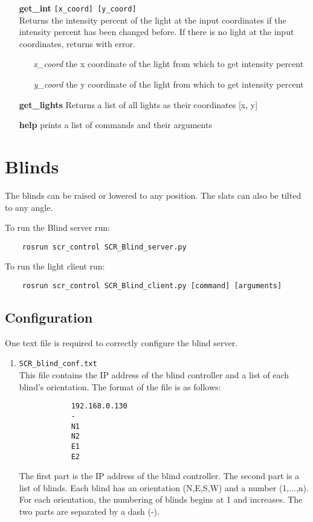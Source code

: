 \documentclass[twoside]{article}
\begin{document}
\begin{enumerate}
		\item[\bf get\_int] \verb|[x_coord] [y_coord]|\\
		Returns the intensity percent of the light at the input coordinates if the intensity percent has been changed before.
		If there is no light at the input coordinates, returns with error.
		
		\begin{enumerate}[leftmargin=3\parindent]
			\item[{\it x\_coord}] the x coordinate of the light from which to get intensity percent
			\item[{\it y\_coord}] the y coordinate of the light from which to get intensity percent
		\end{enumerate}
	
		\item[\bf get\_lights]
		Returns a list of all lights as their coordinates [x, y]
			
		\item[\bf help] prints a list of commands and their arguments
		
	\end{enumerate}


	
	\section{Blinds}
	The blinds can be raised or lowered to any position. The slats can also be tilted to any angle.
	
	To run the Blind server run:
	\begin{verbatim}
	rosrun scr_control SCR_Blind_server.py
	\end{verbatim}
	
	To run the light client run:
	\begin{verbatim}
	rosrun scr_control SCR_Blind_client.py [command] [arguments]
	\end{verbatim}
	
	\subsection{Configuration}
	One text file is required to correctly configure the blind server.
	
	\begin{enumerate}
		\item \verb|SCR_blind_conf.txt|\\
		This file contains the IP address of the blind controller and a list of each blind's orientation. The format of the file is as follows:
		
		\begin{verbatim}
		    192.168.0.130
		    -
		    N1
		    N2
		    E1
		    E2
		\end{verbatim}
		The first part is the IP address of the blind controller. The second part is a list of blinds. Each blind has an orientation (N,E,S,W) and a number (1,...,n). For each orientation, the numbering of blinds begins at 1 and increases. The two parts are separated by a dash (-).
		
	\end{enumerate}
\end{document}
